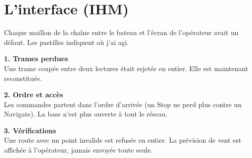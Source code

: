 \documentclass[11pt,a4paper]{article}
\begin{document}
\section{L'interface (IHM)}

Chaque maillon de la chaîne entre le bateau et l'écran de l'opérateur avait un défaut. Les pastilles indiquent où j'ai
agi.

\begin{center}
\end{center}

\noindent
\begin{minipage}[t]{0.32\linewidth}
\begin{ok}\sffamily\small\textbf{1. Trames perdues}\\Une trame coupée entre deux lectures était rejetée en entier. Elle est maintenant reconstituée.\end{ok}
\end{minipage}\hfill
\begin{minipage}[t]{0.32\linewidth}
\begin{ok}\sffamily\small\textbf{2. Ordre et accès}\\Les commandes partent dans l'ordre d'arrivée (un Stop ne perd plus contre un Navigate). La base n'est plus ouverte à tout le réseau.\end{ok}
\end{minipage}\hfill
\begin{minipage}[t]{0.32\linewidth}
\begin{ok}\sffamily\small\textbf{3. Vérifications}\\Une route avec un point invalide est refusée en entier. La prévision de vent est affichée à l'opérateur, jamais envoyée toute seule.\end{ok}
\end{minipage}
\end{document}
